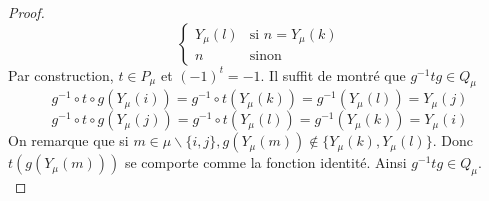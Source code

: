 \begin{proof}
\[\begin{cases}
                            Y_{\mu}(l) & \text{si } n=Y_{\mu}(k)\\
                            n & \text{sinon} 
    \end{cases}\]
    Par construction, $t \in P_{\mu}$ et $(-1)^t = -1$. Il suffit de montré que $g^{-1} t g \in Q_{\mu}$
    \[ g^{-1} \circ t \circ g(Y_{\mu}(i)) = g^{-1} \circ t (Y_{\mu}(k)) = g^{-1}(Y_{\mu}(l)) = Y_{\mu}(j) \]
    \[ g^{-1} \circ t \circ g(Y_{\mu}(j)) = g^{-1} \circ t (Y_{\mu}(l)) = g^{-1}(Y_{\mu}(k)) = Y_{\mu}(i) \]
    On remarque que si $m \in \mu \backslash \{i,j\}, g(Y_{\mu}(m)) \notin \{Y_{\mu}(k), Y_{\mu}(l)\}$. Donc $t(g(Y_{\mu}(m)))$ se comporte comme la fonction identité. Ainsi $g^{-1} t g \in Q_{\mu}$.\\
\end{proof}